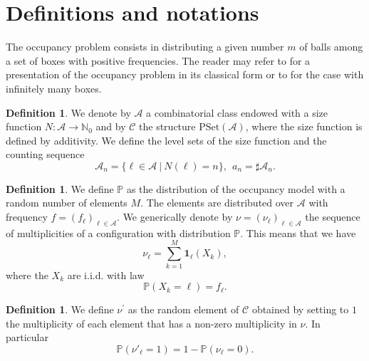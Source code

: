 \documentclass[a4paper,10pt]{article}
\theoremstyle{definition}
\newtheorem{definition}[theorem]{Definition}
\newcommand{\PP}{\mathbb{P}}
\newcommand{\Aa}{\mathcal{A}}
\newcommand{\Cc}{\mathcal{C}}
\newcommand{\NN}{\mathbb{N}}
\newcommand{\PSet}{\mathrm{PSet}}
\begin{document}
\section{Definitions and notations}
The occupancy problem consists in distributing a given number $m$ of balls among a set of boxes with positive frequencies. The reader may refer to \cite{Feller} for a presentation of the occupancy problem in its classical form or to \cite{Gnedin} for the case with infinitely many boxes.

\begin{definition}
We denote by $\Aa$ a combinatorial class endowed with a size function $N:\Aa \rightarrow \NN_0$ and by $\Cc$ the structure $\PSet (\Aa)$, where the size function is defined by additivity. We define the level sets of the size function and the counting sequence
    \begin{equation}
        \Aa_n = \{\ell \in \Aa~ \vert ~ N(\ell)=n\},~~ a_n = \sharp \Aa_n.
    \end{equation}
\end{definition}
\begin{definition}
We define $\PP$ as the distribution of the occupancy model with a random number of elements $M$. The elements are distributed over $\Aa$ with frequency $f=(f_\ell)_{\ell \in \Aa}$. We generically denote by $\nu=(\nu_\ell)_{\ell\in \Aa}$ the sequence of multiplicities of a configuration with distribution $\PP$. This means that we have
\begin{equation}
    \nu_\ell = \sum_{k=1}^M \mathbf{1}_\ell (X_k),
\end{equation}
where the $X_k$ are i.i.d. with law
\begin{equation}
    \PP(X_k =\ell)=f_\ell.
\end{equation}
\end{definition}

\begin{definition}
We define $\nu^{\prime}$ as the random element of $\Cc$ obtained by setting to $1$ the multiplicity of each element that has a non-zero multiplicity in $\nu$. In particular
\begin{equation}
    \PP(\nu'_\ell =1) = 1-\PP(\nu_\ell=0).
\end{equation}
\end{definition}
\end{document}
